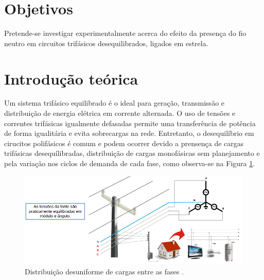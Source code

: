 \documentclass[a4paper,12pt,oneside,openany,table,xcdraw]{article}
\begin{document}
\newcommand{\thedepartment}{Faculdade de Engenharia Elétrica}
\newcommand{\thecourse}{FEELT}
\newcommand{\thetitle}{CIRCUITOS TRIFÁSICOS DESEQUILIBRADOS}
\newcommand{\thetype}{Relatório da Disciplina de Experimental de Circuitos Elétricos II}
\newcommand{\theproftitle}{Bacharel em Engenharia Elétrica}
\newcommand{\thestudent}{Lesly Viviane Montúfar Berrios\\
\centering11811ETE001}
\newcommand{\theadvisor}{Prof. Wellington Maycon Santos Bernardes}
\newcommand{\thecity}{Uberlândia}

\thispagestyle{empty}


\onehalfspacing
\tableofcontents %
\newpage

\section{Objetivos} %
Pretende-se investigar experimentalmente acerca do efeito da presença do fio neutro em circuitos trifásicos desequilibrados, ligados em estrela.

\section{Introdução teórica} %

Um sistema trifásico equilibrado é o ideal para geração, transmissão e distribuição de energia elétrica em corrente alternada. O uso de tensões e correntes trifásicas igualmente defasadas permite uma transferência de potência de forma igualitária e evita sobrecargas na rede. Entretanto, o desequilíbrio em cirucitos polifásicos é comum e podem ocorrer devido a prensença de cargas trifásicas desequílibradas, distribuição de cargas monofásicas sem planejamento e pela variação nos ciclos de demanda de cada fase, como observa-se na Figura \ref{intro:fig1}.

\vspace{0.3cm}
\begin{figure}[H]
\centering
\includegraphics[width=13cm]{DISTRIBUICAO-DESUNIFORME}
\caption{Distribuição desuniforme de cargas entre as fases \cite{PH}.}
\label{intro:fig1}
\end{figure}
\vspace{0.3cm}
\end{document}
